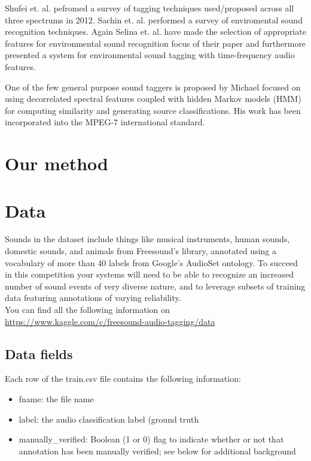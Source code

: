\documentclass{article} %
\begin{document}
Shufei et. al. \cite{cite1} pefromed a survey of tagging techniques used/proposed across all three spectrums in 2012. Sachin et. al. \cite{cite2} performed a survey of enviromental sound recognition techniques. Again Selina et. al. \cite{cite3} have made the selection of appropriate features for environmental sound recognition focus of their paper and furthermore presented \cite{cite4} a system for environmental sound tagging with time-frequency audio features.

One of the few general purpose sound taggers is proposed by Michael \cite{cite5} focused on using decorrelated spectral features coupled with hidden Markov models (HMM) for computing similarity and generating source classifications. His work has been incorporated into the MPEG-7 international standard.

\section{Our method}

\section{Data}
	Sounds in the dataset include things like musical instruments, human sounds, domestic sounds, and animals from Freesound’s library, annotated using a vocabulary of more than 40 labels from Google’s AudioSet ontology. To succeed in this competition your systems will need to be able to recognize an increased number of sound events of very diverse nature, and to leverage subsets of training data featuring annotations of varying reliability.\\
	You can find all the following information on \url{https://www.kaggle.com/c/freesound-audio-tagging/data}
	
	\subsection{Data fields}
		Each row of the train.csv file contains the following information:
			\begin{itemize}
			    \item fname: the file name
			    \item label: the audio classification label (ground truth
			    \item manually\_verified: Boolean (1 or 0) flag to indicate whether or not that annotation has been manually verified; see below for additional background
			\end{itemize}
\end{document}
